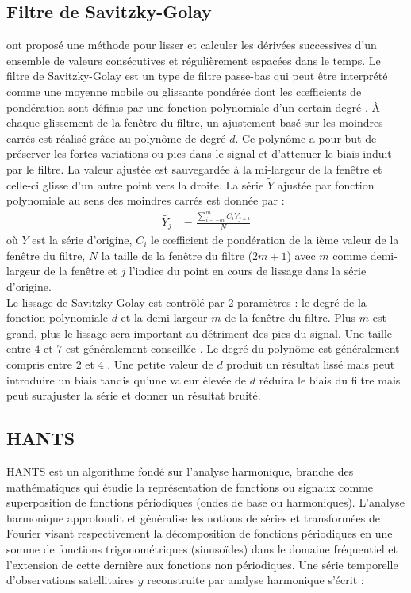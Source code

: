 \subsection{Filtre de Savitzky-Golay}
\citet{Savitzky1964} ont proposé une méthode pour lisser et calculer les dérivées successives d'un ensemble de valeurs consécutives et régulièrement espacées dans le temps. Le filtre de Savitzky-Golay est un type de filtre passe-bas qui peut être interprété comme une moyenne mobile ou glissante pondérée dont les c\oe fficients de pondération sont définis par une fonction polynomiale d'un certain degré \citep{Chen2004}. \`A chaque glissement de la fenêtre du filtre, un ajustement basé sur les moindres carrés est réalisé grâce au polynôme de degré $d$. Ce polynôme a pour but de préserver les fortes variations ou pics dans le signal et d'attenuer le biais induit par le filtre. La valeur ajustée est sauvegardée à la mi-largeur de la fenêtre et celle-ci glisse d'un autre point vers la droite. La série $\tilde{Y}$ ajustée par fonction polynomiale au sens des moindres carrés est donnée par : 
\begin{align}
 \tilde{Y_{j}} &= \frac{\sum_{i=-m}^{m} C_{i}Y_{j+i}}{N}
\end{align}
où $Y$ est la série d'origine, $C_{i}$ le c\oe fficient de pondération de la ième valeur de la fenêtre du filtre, $N$ la taille de la fenêtre du filtre ($2m+1$) avec $m$ comme demi-largeur de la fenêtre et $j$ l'indice du point en cours de lissage dans la série d'origine.\\
Le lissage de Savitzky-Golay est contrôlé par 2 paramètres : le degré de la fonction polynomiale $d$ et la demi-largeur $m$ de la fenêtre du filtre. Plus $m$ est grand, plus le lissage sera important au détriment des pics du signal. Une taille entre $4$ et $7$ est généralement conseillée \citep{Chen2004,Geng2014}. Le degré du polynôme est généralement compris entre $2$ et $4$ \citep{Chen2004}. Une petite valeur de $d$ produit un résultat lissé mais peut introduire un biais tandis qu'une valeur élevée de $d$ réduira le biais du filtre mais peut surajuster la série et donner un résultat bruité. 

\subsection{HANTS}

HANTS est un algorithme fondé sur l'analyse harmonique, branche des mathématiques qui étudie la représentation de fonctions ou signaux comme superposition de fonctions périodiques (ondes de base ou harmoniques). L’analyse harmonique approfondit et généralise les notions de séries et transformées de Fourier visant respectivement la décomposition de fonctions périodiques en une somme de fonctions trigonométriques (sinusoïdes) dans le domaine fréquentiel et l'extension de cette dernière aux fonctions non périodiques. Une série temporelle d’observations satellitaires $y$ reconstruite par analyse harmonique s’écrit :

